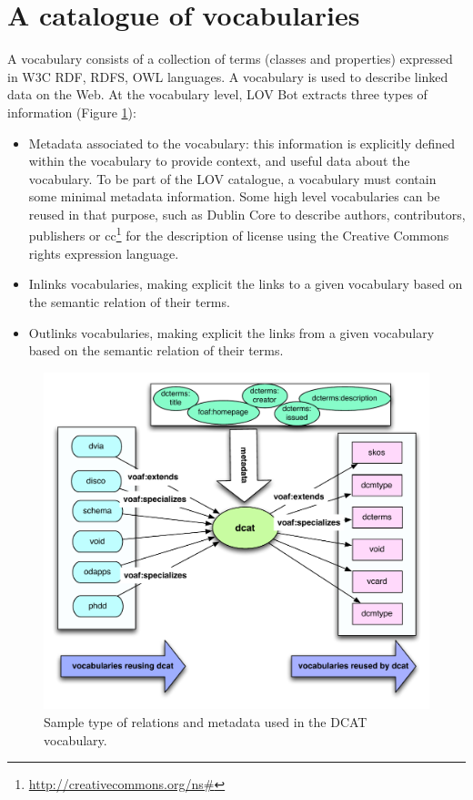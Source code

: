 \documentclass{iosart2c}
\begin{document}
\section{A catalogue of vocabularies}
\label{sec:metadata}
A vocabulary consists of a collection of terms (classes and properties) expressed in W3C RDF, RDFS, OWL languages. A vocabulary is used to describe linked data on the Web. At the vocabulary level, LOV Bot extracts three types of information (Figure \ref{fig:dcat}):
\begin{itemize}
\item Metadata associated to the vocabulary: this information is explicitly defined within the vocabulary to provide context, and useful data about the vocabulary. To be part of the LOV catalogue, a vocabulary must contain some minimal metadata information\cite{vandenbussche2011metadata}. Some high level vocabularies can be reused in that purpose, such as Dublin Core to describe authors, contributors, publishers or cc\footnote{\url{http://creativecommons.org/ns#}} for the description of license using the Creative Commons rights expression language.

\item Inlinks vocabularies, making explicit the links to a given vocabulary based on the semantic relation of their terms.

\item Outlinks vocabularies, making explicit the links from a given vocabulary based on the semantic relation of their terms.
\end{itemize}

\begin{figure}[ht!b]
\includegraphics[scale=0.5]{dcat-relations.pdf}
\caption{Sample type of relations and metadata used in the DCAT vocabulary.}
\label{fig:dcat}
\end{figure}
\end{document}
